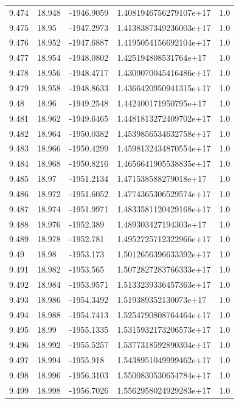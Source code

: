 \begin{tabular}{lllll}
9.474 & 18.948 & -1946.9059 & 1.4081946756279107e+17 & 1.0 \\
9.475 & 18.95 & -1947.2973 & 1.4138387349236003e+17 & 1.0 \\
9.476 & 18.952 & -1947.6887 & 1.4195054156692104e+17 & 1.0 \\
9.477 & 18.954 & -1948.0802 & 1.425194808531764e+17 & 1.0 \\
9.478 & 18.956 & -1948.4717 & 1.4309070045416486e+17 & 1.0 \\
9.479 & 18.958 & -1948.8633 & 1.4366420950941315e+17 & 1.0 \\
9.48 & 18.96 & -1949.2548 & 1.442400171950795e+17 & 1.0 \\
9.481 & 18.962 & -1949.6465 & 1.4481813272409702e+17 & 1.0 \\
9.482 & 18.964 & -1950.0382 & 1.4539856534632758e+17 & 1.0 \\
9.483 & 18.966 & -1950.4299 & 1.4598132434870554e+17 & 1.0 \\
9.484 & 18.968 & -1950.8216 & 1.4656641905538835e+17 & 1.0 \\
9.485 & 18.97 & -1951.2134 & 1.471538588279018e+17 & 1.0 \\
9.486 & 18.972 & -1951.6052 & 1.4774365306529574e+17 & 1.0 \\
9.487 & 18.974 & -1951.9971 & 1.4833581120429168e+17 & 1.0 \\
9.488 & 18.976 & -1952.389 & 1.489303427194303e+17 & 1.0 \\
9.489 & 18.978 & -1952.781 & 1.4952725712322966e+17 & 1.0 \\
9.49 & 18.98 & -1953.173 & 1.5012656396633392e+17 & 1.0 \\
9.491 & 18.982 & -1953.565 & 1.5072827283766333e+17 & 1.0 \\
9.492 & 18.984 & -1953.9571 & 1.5133239336457363e+17 & 1.0 \\
9.493 & 18.986 & -1954.3492 & 1.519389352130073e+17 & 1.0 \\
9.494 & 18.988 & -1954.7413 & 1.5254790808764464e+17 & 1.0 \\
9.495 & 18.99 & -1955.1335 & 1.5315932173206573e+17 & 1.0 \\
9.496 & 18.992 & -1955.5257 & 1.5377318592890304e+17 & 1.0 \\
9.497 & 18.994 & -1955.918 & 1.5438951049999462e+17 & 1.0 \\
9.498 & 18.996 & -1956.3103 & 1.5500830530654784e+17 & 1.0 \\
9.499 & 18.998 & -1956.7026 & 1.5562958024929283e+17 & 1.0 \\

\end{tabular}

